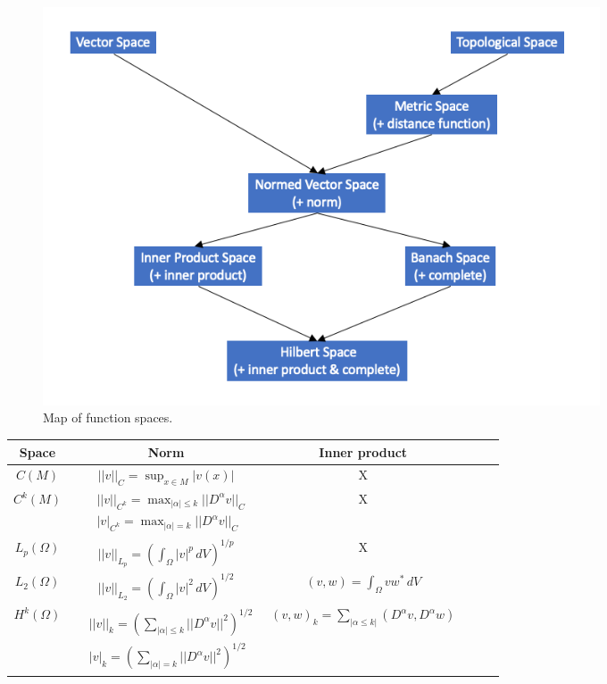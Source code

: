 \documentclass[oneside,a4paper,11pt]{report}
\begin{document}
\begin{figure}[ht]
   \centering
   \includegraphics[width=0.8\textwidth]{../../images/function_spaces.png}
   \caption{Map of function spaces.}
   \label{fig:function_spaces}
\end{figure}

\setlength{\cellspacetoplimit}{3pt}
\setlength{\cellspacebottomlimit}{3pt}

\begin{center}
\begin{tabular}{Sc|Sc|Sc}
    Space & Norm & Inner product \\
    \hline
    $C(M)$ & $ \displaystyle ||v||_C = \sup_{x \in M} |v(x)| $ & X \\
    \hline
    $C^k(M)$ & $\begin{aligned} &||v||_{C^k} = \max_{|\alpha| \le k} ||D^\alpha v||_C \\ &|v|_{C^k}=\max_{|\alpha| = k} ||D^\alpha v||_C \end{aligned}$ & X \\
    \hline
    $L_p(\Omega)$ & $ \displaystyle ||v||_{L_p} = \left ( \int_\Omega |v|^p \, dV \right)^{1/p} $ & X \\
    \hline
    $L_2(\Omega)$ & $ \displaystyle ||v||_{L_2} = \left ( \int_\Omega |v|^2 \, dV \right)^{1/2} $ & $ \displaystyle (v,w) = \int_\Omega vw^* \, dV $ \\
    \hline
    $H^k(\Omega)$ & $ \begin{aligned} &||v||_k = \left ( \sum_{|\alpha| \le k} ||D^\alpha v||^2 \right )^{1/2} \\ &|v|_k = \left ( \sum_{|\alpha| = k} ||D^\alpha v||^2 \right )^{1/2} \end{aligned}$ & $ \displaystyle (v,w)_k = \sum_{|\alpha \le k|} (D^\alpha v, D^\alpha w) $
\end{tabular}
\end{center}
\end{document}

